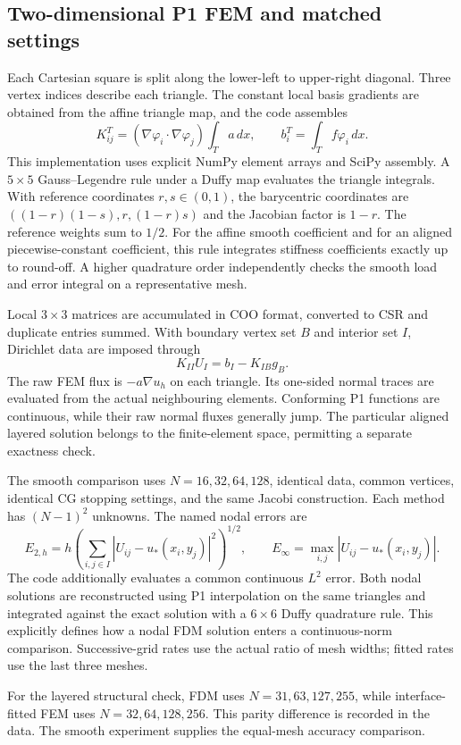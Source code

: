 \subsection{Two-dimensional P1 FEM and matched settings}
Each Cartesian square is split along the lower-left to upper-right diagonal. Three vertex indices describe each triangle. The constant local basis gradients are obtained from the affine triangle map, and the code assembles
\[
K_{ij}^{T}=(\nabla\varphi_i\cdot\nabla\varphi_j)\int_T a\,dx,
\qquad b_i^T=\int_Tf\varphi_i\,dx.
\]
This implementation uses explicit NumPy element arrays and SciPy assembly. A $5\times5$ Gauss--Legendre rule under a Duffy map evaluates the triangle integrals. With reference coordinates $r,s\in(0,1)$, the barycentric coordinates are $((1-r)(1-s),r,(1-r)s)$ and the Jacobian factor is $1-r$. The reference weights sum to $1/2$. For the affine smooth coefficient and for an aligned piecewise-constant coefficient, this rule integrates stiffness coefficients exactly up to round-off. A higher quadrature order independently checks the smooth load and error integral on a representative mesh.

Local $3\times3$ matrices are accumulated in COO format, converted to CSR and duplicate entries summed. With boundary vertex set $B$ and interior set $I$, Dirichlet data are imposed through
\[
K_{II}U_I=b_I-K_{IB}g_B.
\]
The raw FEM flux is $-a\nabla u_h$ on each triangle. Its one-sided normal traces are evaluated from the actual neighbouring elements. Conforming P1 functions are continuous, while their raw normal fluxes generally jump. The particular aligned layered solution belongs to the finite-element space, permitting a separate exactness check.

The smooth comparison uses $N=16,32,64,128$, identical data, common vertices, identical CG stopping settings, and the same Jacobi construction. Each method has $(N-1)^2$ unknowns. The named nodal errors are
\[
E_{2,h}=h\left(\sum_{i,j\in I}|U_{ij}-u_*(x_i,y_j)|^2\right)^{1/2},
\qquad E_\infty=\max_{i,j}|U_{ij}-u_*(x_i,y_j)|.
\]
The code additionally evaluates a common continuous $L^2$ error. Both nodal solutions are reconstructed using P1 interpolation on the same triangles and integrated against the exact solution with a $6\times6$ Duffy quadrature rule. This explicitly defines how a nodal FDM solution enters a continuous-norm comparison. Successive-grid rates use the actual ratio of mesh widths; fitted rates use the last three meshes.

For the layered structural check, FDM uses $N=31,63,127,255$, while interface-fitted FEM uses $N=32,64,128,256$. This parity difference is recorded in the data. The smooth experiment supplies the equal-mesh accuracy comparison.


